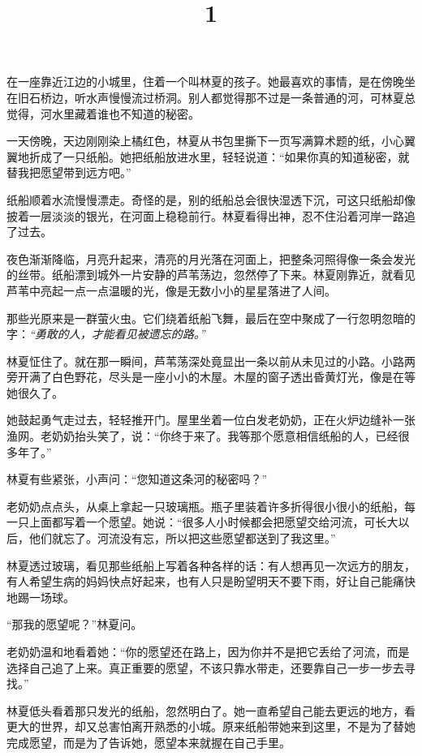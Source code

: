 \documentclass[12pt]{article}
\title{1}
\author{}
\date{}
\begin{document}
\maketitle

在一座靠近江边的小城里，住着一个叫林夏的孩子。她最喜欢的事情，是在傍晚坐在旧石桥边，听水声慢慢流过桥洞。别人都觉得那不过是一条普通的河，可林夏总觉得，河水里藏着谁也不知道的秘密。

一天傍晚，天边刚刚染上橘红色，林夏从书包里撕下一页写满算术题的纸，小心翼翼地折成了一只纸船。她把纸船放进水里，轻轻说道：“如果你真的知道秘密，就替我把愿望带到远方吧。”

纸船顺着水流慢慢漂走。奇怪的是，别的纸船总会很快湿透下沉，可这只纸船却像披着一层淡淡的银光，在河面上稳稳前行。林夏看得出神，忍不住沿着河岸一路追了过去。

夜色渐渐降临，月亮升起来，清亮的月光落在河面上，把整条河照得像一条会发光的丝带。纸船漂到城外一片安静的芦苇荡边，忽然停了下来。林夏刚靠近，就看见芦苇中亮起一点一点温暖的光，像是无数小小的星星落进了人间。

那些光原来是一群萤火虫。它们绕着纸船飞舞，最后在空中聚成了一行忽明忽暗的字：\textit{“勇敢的人，才能看见被遗忘的路。”}

林夏怔住了。就在那一瞬间，芦苇荡深处竟显出一条以前从未见过的小路。小路两旁开满了白色野花，尽头是一座小小的木屋。木屋的窗子透出昏黄灯光，像是在等她很久了。

她鼓起勇气走过去，轻轻推开门。屋里坐着一位白发老奶奶，正在火炉边缝补一张渔网。老奶奶抬头笑了，说：“你终于来了。我等那个愿意相信纸船的人，已经很多年了。”

林夏有些紧张，小声问：“您知道这条河的秘密吗？”

老奶奶点点头，从桌上拿起一只玻璃瓶。瓶子里装着许多折得很小很小的纸船，每一只上面都写着一个愿望。她说：“很多人小时候都会把愿望交给河流，可长大以后，他们就忘了。河流没有忘，所以把这些愿望都送到了我这里。”

林夏透过玻璃，看见那些纸船上写着各种各样的话：有人想再见一次远方的朋友，有人希望生病的妈妈快点好起来，也有人只是盼望明天不要下雨，好让自己能痛快地踢一场球。

“那我的愿望呢？”林夏问。

老奶奶温和地看着她：“你的愿望还在路上，因为你并不是把它丢给了河流，而是选择自己追了上来。真正重要的愿望，不该只靠水带走，还要靠自己一步一步去寻找。”

林夏低头看着那只发光的纸船，忽然明白了。她一直希望自己能去更远的地方，看更大的世界，却又总害怕离开熟悉的小城。原来纸船带她来到这里，不是为了替她完成愿望，而是为了告诉她，愿望本来就握在自己手里。
\end{document}
